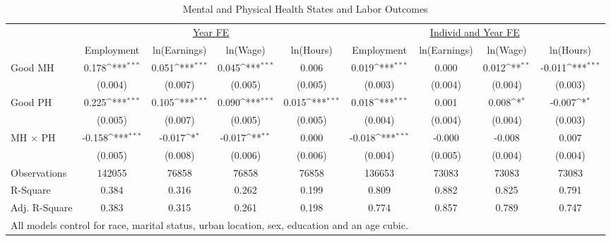 \def\sym#1{\ifmmode^{#1}\else\(^{#1}\)\fi}
\begin{table}
\center\caption*{Mental and Physical Health States and Labor Outcomes}
\footnotesize
\begin{tabular}{l*{8}{c}}
                    &\multicolumn{4}{c}{\underline{Year FE}}                                                &\multicolumn{4}{c}{\underline{Individ and Year FE}}                                    \\\cmidrule(lr){2-5}\cmidrule(lr){6-9}
                    &\multicolumn{1}{c}{Employment}&\multicolumn{1}{c}{ln(Earnings)}&\multicolumn{1}{c}{ln(Wage)}&\multicolumn{1}{c}{ln(Hours)}&\multicolumn{1}{c}{Employment}&\multicolumn{1}{c}{ln(Earnings)}&\multicolumn{1}{c}{ln(Wage)}&\multicolumn{1}{c}{ln(Hours)}\\
\midrule
Good MH             &       0.178\sym{***}&       0.051\sym{***}&       0.045\sym{***}&       0.006         &       0.019\sym{***}&       0.000         &       0.012\sym{**} &      -0.011\sym{***}\\
                    &     (0.004)         &     (0.007)         &     (0.005)         &     (0.005)         &     (0.003)         &     (0.004)         &     (0.004)         &     (0.003)         \\
Good PH             &       0.225\sym{***}&       0.105\sym{***}&       0.090\sym{***}&       0.015\sym{***}&       0.018\sym{***}&       0.001         &       0.008\sym{*}  &      -0.007\sym{*}  \\
                    &     (0.005)         &     (0.007)         &     (0.005)         &     (0.005)         &     (0.004)         &     (0.004)         &     (0.004)         &     (0.003)         \\
MH $\times$ PH      &      -0.158\sym{***}&      -0.017\sym{*}  &      -0.017\sym{**} &       0.000         &      -0.018\sym{***}&      -0.000         &      -0.008         &       0.007         \\
                    &     (0.005)         &     (0.008)         &     (0.006)         &     (0.006)         &     (0.004)         &     (0.005)         &     (0.004)         &     (0.004)         \\
\midrule
Observations        &      142055         &       76858         &       76858         &       76858         &      136653         &       73083         &       73083         &       73083         \\
R-Square            &       0.384         &       0.316         &       0.262         &       0.199         &       0.809         &       0.882         &       0.825         &       0.791         \\
Adj. R-Square       &       0.383         &       0.315         &       0.261         &       0.198         &       0.774         &       0.857         &       0.789         &       0.747         \\
\bottomrule
\multicolumn{9}{l}{\footnotesize{All models control for race, marital status, urban location, sex, education and an age cubic.}} \\
\end{tabular}
\end{table}
